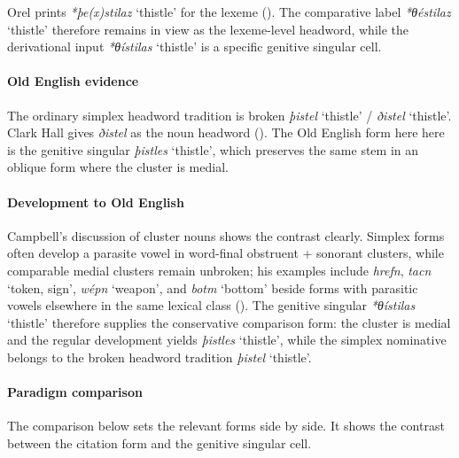 \documentclass[
  british,
  a4paper,
]{article}
\providecommand{\Recon}[1]{\emph{*#1}}
\begin{document}
Orel prints \emph{*þe(x)stilaz} `thistle' for the lexeme
(). The comparative label
\Recon{θéstilaz} `thistle' therefore remains in view as the lexeme-level
headword, while the derivational input \Recon{θístilas} `thistle' is a
specific genitive singular cell.

\paragraph{Old English evidence}\label{old-english-evidence-133}

The ordinary simplex headword tradition is broken {\emph{þistel}}
`thistle' / {\emph{ðistel}} `thistle'. Clark Hall gives {\emph{ðistel}}
as the noun headword (). The Old English form here here is the genitive singular
{\emph{þistles}} `thistle', which preserves the same stem in an oblique
form where the cluster is medial.

\paragraph{Development to Old
English}\label{development-to-old-english-133}

Campbell's discussion of cluster nouns shows the contrast clearly.
Simplex forms often develop a parasite vowel in word-final obstruent +
sonorant clusters, while comparable medial clusters remain unbroken; his
examples include \emph{hrefn}, {\emph{tacn}} `token, sign',
{\emph{wépn}} `weapon', and {\emph{botm}} `bottom' beside forms with
parasitic vowels elsewhere in the same lexical class
(). The genitive singular
\Recon{θístilas} `thistle' therefore supplies the conservative
comparison form: the cluster is medial and the regular development
yields {\emph{þistles}} `thistle', while the simplex nominative belongs
to the broken headword tradition {\emph{þistel}} `thistle'.

\paragraph{Paradigm comparison}\label{paradigm-comparison-16}

The comparison below sets the relevant forms side by side. It shows the
contrast between the citation form and the genitive singular cell.
\end{document}
